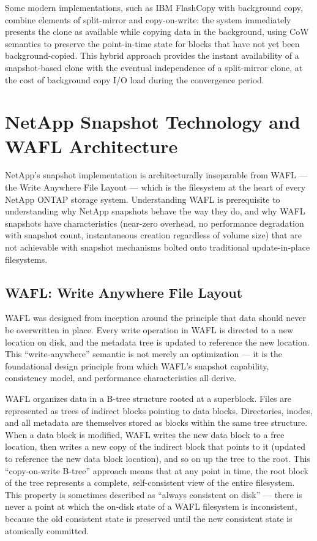 Some modern implementations, such as IBM FlashCopy with background copy, combine elements of split-mirror and copy-on-write: the system immediately presents the clone as available while copying data in the background, using CoW semantics to preserve the point-in-time state for blocks that have not yet been background-copied. This hybrid approach provides the instant availability of a snapshot-based clone with the eventual independence of a split-mirror clone, at the cost of background copy I/O load during the convergence period.

\section{NetApp Snapshot Technology and WAFL Architecture}

NetApp's snapshot implementation is architecturally inseparable from WAFL --- the Write Anywhere File Layout --- which is the filesystem at the heart of every NetApp ONTAP storage system. Understanding WAFL is prerequisite to understanding why NetApp snapshots behave the way they do, and why WAFL snapshots have characteristics (near-zero overhead, no performance degradation with snapshot count, instantaneous creation regardless of volume size) that are not achievable with snapshot mechanisms bolted onto traditional update-in-place filesystems.

\subsection{WAFL: Write Anywhere File Layout}

WAFL was designed from inception around the principle that data should never be overwritten in place. Every write operation in WAFL is directed to a new location on disk, and the metadata tree is updated to reference the new location. This ``write-anywhere'' semantic is not merely an optimization --- it is the foundational design principle from which WAFL's snapshot capability, consistency model, and performance characteristics all derive.

WAFL organizes data in a B-tree structure rooted at a superblock. Files are represented as trees of indirect blocks pointing to data blocks. Directories, inodes, and all metadata are themselves stored as blocks within the same tree structure. When a data block is modified, WAFL writes the new data block to a free location, then writes a new copy of the indirect block that points to it (updated to reference the new data block location), and so on up the tree to the root. This ``copy-on-write B-tree'' approach means that at any point in time, the root block of the tree represents a complete, self-consistent view of the entire filesystem. This property is sometimes described as ``always consistent on disk'' --- there is never a point at which the on-disk state of a WAFL filesystem is inconsistent, because the old consistent state is preserved until the new consistent state is atomically committed.

